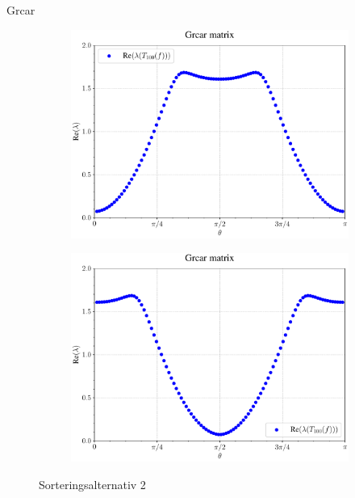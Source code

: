 \documentclass{beamer}
\begin{document}
\begin{frame}{Grcar}
    \begin{figure}[H]
    \centering
    \begin{subfigure}{0.49\textwidth}
        \includegraphics[width=\textwidth]{images/Grcar3.pdf}
        \caption{}
        \label{fig:Grcar sort3}
    \end{subfigure}
    \hfill
    \begin{subfigure}{0.49\textwidth}
        \includegraphics[width=\textwidth]{images/Grcar4.pdf}
        \caption{}
        \label{fig:Grcar sort4}
    \end{subfigure}
    \caption{Sorteringsalternativ 2}
    \label{fig:Sorteringsalternativ 2}
    \end{figure}
\end{frame}
\end{document}
